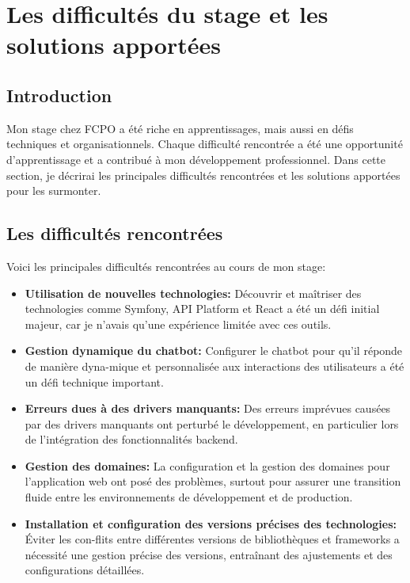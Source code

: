 \chapter{Les difficultés du stage et les solutions apportées}
\label{chap:Chapter 6 title} 
\section*{Introduction}

Mon stage chez FCPO a été riche en apprentissages, mais aussi en défis techniques et organisationnels. Chaque difficulté rencontrée a été une opportunité d'apprentissage et a contribué à mon développement professionnel. Dans cette section, je décrirai les principales difficultés rencontrées et les solutions apportées pour les surmonter.

\pagebreak

\section{Les difficultés rencontrées}

\hspace{16pt}Voici les principales difficultés rencontrées au cours de mon stage:

\begin{itemize}
  \item \textbf{Utilisation de nouvelles technologies: }Découvrir et maîtriser des technologies comme Symfony, API Platform et React a été un défi initial majeur, car je n'avais qu'une expérience limitée avec ces outils.
  \item \textbf{Gestion dynamique du chatbot: }Configurer le chatbot pour qu'il réponde de manière dyna-mique et personnalisée aux interactions des utilisateurs a été un défi technique important.
  \item \textbf{Erreurs dues à des drivers manquants: }Des erreurs imprévues causées par des drivers manquants ont perturbé le développement, en particulier lors de l'intégration des fonctionnalités backend.
  \item \textbf{Gestion des domaines: }La configuration et la gestion des domaines pour l'application web ont posé des problèmes, surtout pour assurer une transition fluide entre les environnements de développement et de production.
  \item \textbf{Installation et configuration des versions précises des technologies: }Éviter les con-flits entre différentes versions de bibliothèques et frameworks a nécessité une gestion précise des versions, entraînant des ajustements et des configurations détaillées.
\end{itemize}

